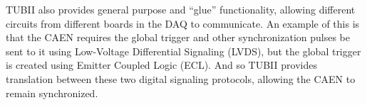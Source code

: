TUBII also provides general purpose and ``glue'' functionality,
allowing different circuits from different boards in the DAQ to communicate.
An example of this is that the CAEN requires the global trigger and
other synchronization pulses be sent to it using Low-Voltage Differential
Signaling (LVDS), but the global trigger is created using Emitter Coupled
Logic (ECL).
And so TUBII provides translation between these two digital signaling protocols,
allowing the CAEN to remain synchronized.


